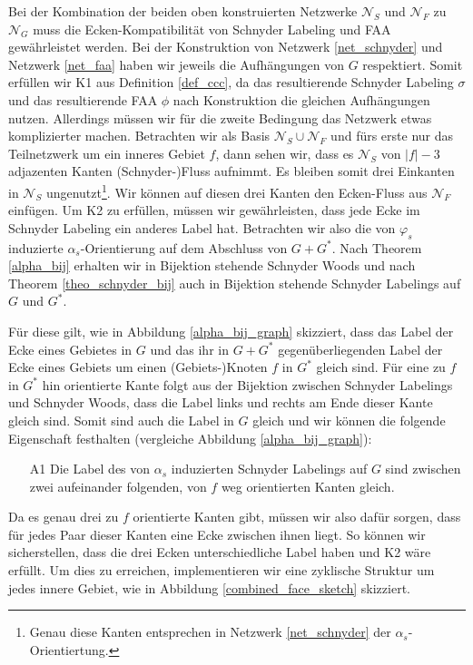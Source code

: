 Bei der Kombination der beiden oben konstruierten Netzwerke $\mathcal{N}_S$ und $\mathcal{N}_F$ zu $\mathcal{N}_G$ muss die Ecken-Kompatibilität von Schnyder Labeling und FAA gewährleistet werden. Bei der Konstruktion von Netzwerk \ref{net_schnyder} und Netzwerk \ref{net_faa} haben wir jeweils die Aufhängungen von $G$ respektiert. Somit erfüllen wir K1 aus Definition \ref{def_ccc}, da das resultierende Schnyder Labeling $\sigma$ und das resultierende FAA $\phi$ nach Konstruktion die gleichen Aufhängungen nutzen. Allerdings müssen wir für die zweite Bedingung das Netzwerk etwas komplizierter machen. Betrachten wir als Basis $\mathcal{N}_S \cup \mathcal{N}_F$ und fürs erste nur das Teilnetzwerk um ein inneres Gebiet $f$, dann sehen wir, dass es $\mathcal{N}_S$ von $|f|-3$ adjazenten Kanten (Schnyder-)Fluss aufnimmt. Es bleiben somit drei Einkanten in $\mathcal{N}_S$ ungenutzt\footnote{Genau diese Kanten entsprechen in Netzwerk \ref{net_schnyder} der $\alpha_s$-Orientiertung.}. Wir können auf diesen drei Kanten den Ecken-Fluss aus $\mathcal{N}_F$ einfügen. Um K2 zu erfüllen, müssen wir gewährleisten, dass jede Ecke im Schnyder Labeling ein anderes Label hat. Betrachten wir also die von $\varphi_s$ induzierte $\alpha_s$-Orientierung auf dem Abschluss von $G+G^*$. Nach Theorem \ref{alpha_bij} erhalten wir in Bijektion stehende Schnyder Woods und nach Theorem \ref{theo_schnyder_bij} auch in Bijektion stehende Schnyder Labelings auf $G$ und $G^*$.

Für diese gilt, wie in Abbildung \ref{alpha_bij_graph} skizziert, dass das Label der Ecke eines Gebietes in $G$ und das ihr in $G+G^*$ gegenüberliegenden Label der Ecke eines Gebiets um einen (Gebiets-)Knoten $f$ in $G^*$ gleich sind. Für eine zu $f$ in $G^*$ hin orientierte Kante folgt aus der Bijektion zwischen Schnyder Labelings und Schnyder Woods, dass die Label links und rechts am Ende dieser Kante gleich sind. Somit sind auch die Label in $G$ gleich und wir können die folgende Eigenschaft festhalten (vergleiche Abbildung \ref{alpha_bij_graph}):

\begin{itemize}
\item [A1] Die Label des von $\alpha_s$ induzierten Schnyder Labelings auf $G$ sind zwischen zwei aufeinander folgenden, von $f$ weg orientierten Kanten gleich.
\end{itemize}

Da es genau drei zu $f$ orientierte Kanten gibt, müssen wir also dafür sorgen, dass für jedes Paar dieser Kanten eine Ecke zwischen ihnen liegt. So können wir sicherstellen, dass die drei Ecken unterschiedliche Label haben und K2 wäre erfüllt. Um dies zu erreichen, implementieren wir eine zyklische Struktur um jedes innere Gebiet, wie in Abbildung \ref{combined_face_sketch} skizziert.

